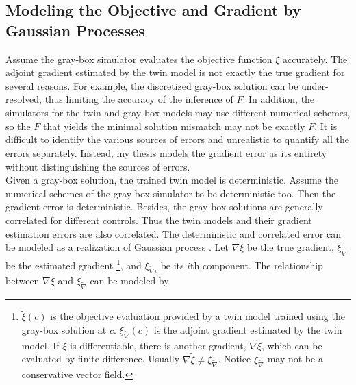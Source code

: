 \subsection{Modeling the Objective and Gradient by Gaussian Processes}
\label{sec: chap3 cokriging}
Assume the gray-box simulator evaluates the objective function $\xi$ accurately.
The adjoint gradient estimated by the twin model
is not exactly the true gradient for several reasons. For example, 
the discretized 
gray-box solution can be under-resolved, thus limiting the accuracy of the inference of $F$.
In addition, the simulators for the twin and gray-box models may use different
numerical schemes, so the $\tilde{F}$ that yields the minimal solution mismatch may not
be exactly $F$.
It is difficult to identify the various sources of errors and unrealistic to quantify all the
errors separately. Instead, my thesis models the gradient error as its entirety without 
distinguishing the sources of errors.\\

Given a gray-box solution, the trained twin model is deterministic. 
Assume the numerical schemes of the gray-box simulator to be deterministic too.
Then the gradient error is deterministic. Besides, the gray-box solutions are
generally correlated for different controls. Thus the twin models and their gradient 
estimation errors are also correlated.
The deterministic and correlated error can be modeled as a realization of Gaussian process
\cite{non param calibrate 1, non param calibrate 2, non param calibrate 3}.
Let $\nabla\xi$ be the true gradient,
$\xi_{\tilde{\nabla}}$ be the estimated gradient \footnote{
$\tilde{\xi}(c)$ is the objective evaluation provided by a twin model 
trained using the gray-box solution at $c$. $\xi_{\tilde{\nabla}}(c)$ is the adjoint
gradient estimated by the twin model. If $\tilde{\xi}$ is differentiable, there
is another gradient, $\nabla \tilde{\xi}$, which can be evaluated by finite difference. 
Usually $\nabla \tilde{\xi}\neq \xi_{\tilde{\nabla}}$. Notice
$\xi_{\tilde{\nabla}}$ may not be a conservative vector field.}, and
$\xi_{\tilde{\nabla}i}$ be its $i$th component.
The relationship between $\nabla \xi$ and $\xi_{\tilde{\nabla}}$ can be modeled by 
\cite{non param calibrate 1, non param calibrate 2, non param calibrate 3}

